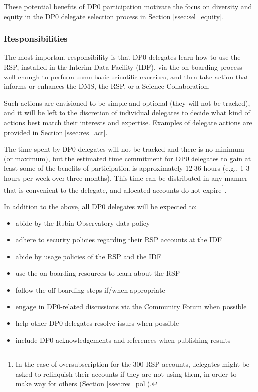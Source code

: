 \documentclass[DM,lsstdraft,authoryear,toc]{lsstdoc}
\begin{document}
These potential benefits of DP0 participation motivate the focus on diversity and equity in the DP0 delegate selection process in Section \ref{ssec:sel_equity}.

\subsubsection{Responsibilities}\label{sssec:intro_del_resp}

The most important responsibility is that DP0 delegates learn how to use the RSP,  installed in the Interim Data Facility (IDF), via the on-boarding process well enough to perform some basic scientific exercises, and then take action that informs or enhances the DMS, the RSP, or a Science Collaboration. 

Such actions are envisioned to be simple and optional (they will not be tracked), and it will be left to the discretion of individual delegates to decide what kind of actions best match their interests and expertise.
Examples of delegate actions are provided in Section \ref{ssec:res_act}.

The time spent by DP0 delegates will not be tracked and there is no minimum (or maximum), but the estimated time commitment for DP0 delegates to gain at least some of the benefits of participation is approximately 12-36 hours (e.g., 1-3 hours per week over three months).
This time can be distributed in any manner that is convenient to the delegate, and allocated accounts do not expire\footnote{In the case of oversubscription for the 300 RSP accounts, delegates might be asked to relinquish their accounts if they are not using them, in order to make way for others (Section \ref{ssec:res_pol}).}.

In addition to the above, all DP0 delegates will be expected to:
\begin{itemize}
\item abide by the Rubin Observatory data policy 
\item adhere to security policies regarding their RSP accounts at the IDF
\item abide by usage policies of the RSP and the IDF
\item use the on-boarding resources to learn about the RSP
\item follow the off-boarding steps if/when appropriate
\item engage in DP0-related discussions via the Community Forum when possible
\item help other DP0 delegates resolve issues when possible
\item include DP0 acknowledgements and references when publishing results
\end{itemize}
\end{document}
